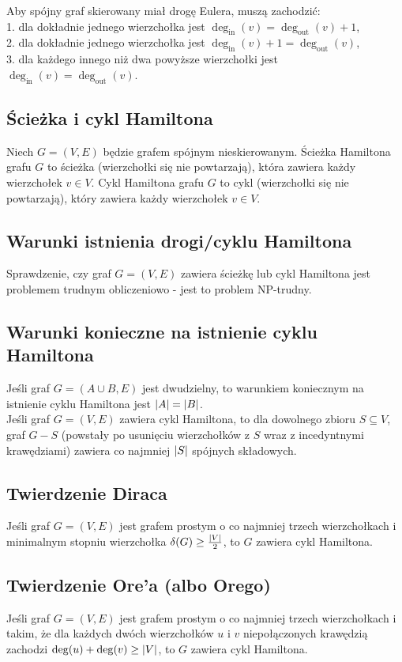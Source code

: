 Aby spójny graf skierowany miał drogę Eulera, muszą zachodzić: \\
1. dla dokładnie jednego wierzchołka jest $\deg_\text{in}(v) = \deg_\text{out}(v) + 1$, \\
2. dla dokładnie jednego wierzchołka jest $\deg_\text{in}(v) + 1 = \deg_\text{out}(v)$, \\
3. dla każdego innego niż dwa powyższe wierzchołki jest 
$\deg_\text{in}(v) = \deg_\text{out}(v)$.

\subsection*{Ścieżka i cykl Hamiltona}
Niech $G = (V, E)$ będzie grafem spójnym nieskierowanym. Ścieżka Hamiltona grafu
$G$ to ścieżka (wierzchołki się nie powtarzają), która zawiera każdy wierzchołek
$v \in V$. Cykl Hamiltona grafu $G$ to cykl (wierzchołki się nie powtarzają),
który zawiera każdy wierzchołek $v \in V$.

\subsection*{Warunki istnienia drogi/cyklu Hamiltona}
Sprawdzenie, czy graf $G = (V, E)$ zawiera ścieżkę lub cykl Hamiltona jest 
problemem trudnym obliczeniowo - jest to problem NP-trudny.

\subsection*{Warunki konieczne na istnienie cyklu Hamiltona}
Jeśli graf $G = (A \cup B, E)$ jest dwudzielny, to warunkiem koniecznym na istnienie
cyklu Hamiltona jest $\left| A \right| = \left| B \right|$. \\ 
Jeśli graf $G = (V, E)$ zawiera cykl Hamiltona, to dla dowolnego zbioru $S \subseteq V$,
graf $G - S$ (powstały po usunięciu wierzchołków z $S$ wraz z incedyntnymi krawędziami)
zawiera co najmniej $\left| S \right|$ spójnych składowych.

\subsection*{Twierdzenie Diraca}
Jeśli graf $G = (V, E)$ jest grafem prostym o co najmniej trzech wierzchołkach
i minimalnym stopniu wierzchołka $\delta (G) \geq \frac{\left| V \right|}{2}$, to $G$ zawiera
cykl Hamiltona.

\subsection*{Twierdzenie Ore'a (albo Orego)}
Jeśli graf $G = (V, E)$ jest grafem prostym o co najmniej trzech wierzchołkach i takim,
że dla każdych dwóch wierzchołków $u$ i $v$ niepołączonych krawędzią zachodzi 
$\deg (u) + \deg (v) \geq \left| V \right|$, to $G$ zawiera cykl Hamiltona.

